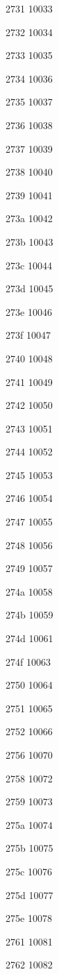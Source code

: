 \documentclass[11pt]{article}
\begin{document}
2731 10033 

2732 10034 

2733 10035 

2734 10036 

2735 10037 

2736 10038 

2737 10039 

2738 10040 

2739 10041 

273a 10042 

273b 10043 

273c 10044 

273d 10045 

273e 10046 

273f 10047 

2740 10048 

2741 10049 

2742 10050 

2743 10051 

2744 10052 

2745 10053 

2746 10054 

2747 10055 

2748 10056 

2749 10057 

274a 10058 

274b 10059 

274d 10061 

274f 10063 

2750 10064 

2751 10065 

2752 10066 

2756 10070 

2758 10072 

2759 10073 

275a 10074 

275b 10075 

275c 10076 

275d 10077 

275e 10078 

2761 10081 

2762 10082 
\end{document}
